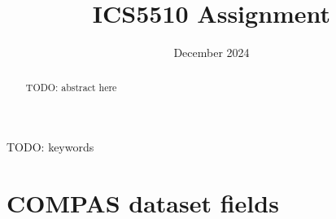 \documentclass[conference]{IEEEtran}
\begin{document}
	
	\title{ICS5510 Assignment}
	
	\author{
		\date{December 2024}
		
	}
	
	\maketitle
	
	\begin{abstract}
	TODO: abstract here
	\end{abstract}
	
	\begin{IEEEkeywords}
		TODO: keywords
	\end{IEEEkeywords}
	
	
	
	
	
	
	
	
	
	
	
	
	
	
	
	
	
	
	
	
	
	
	
	
	
	
	
	
	
	
	
	
	
	
	
	
	
	
	
	

	
	

	


	
	
\printbibliography

\onecolumn
\pagebreak
\appendix 
\section{COMPAS dataset fields}
\end{document}
